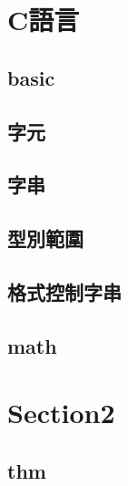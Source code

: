 \section{C語言}
    \subsection{basic}
        
    \subsection{字元}
        
    \subsection{字串}
        
    \subsection{型別範圍}
        
    \subsection{格式控制字串}
        
    \subsection{math}
        

\section{Section2}
    \subsection{thm}
        